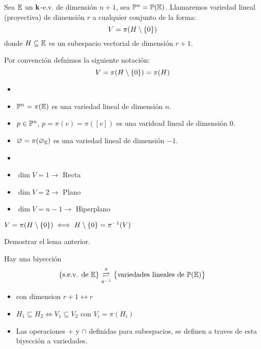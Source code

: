 \begin{defi}
	Sea $\mathbb{E}$ un $\mathbf{k}$-e.v. de dimensión $n+1$, sea $\mathbb{P}^n = \mathbb{P}(\mathbb{E})$.
	Llamaremos variedad lineal (proyectiva) de dimensión $r$ a cualquier conjunto 
	de la forma:
	\[V = \pi(H \setminus \left\{0\right\})\]
	donde $H \subseteq \mathbb{E}$ es un subespacio vectorial de dimensión $r+1$.
	
	Por convención defnimos la siguiente notación:
	\[V = \pi(H \setminus \left\{0\right\}) = \pi(H)\]         
\end{defi}    
\begin{example}
	\begin{itemize}
		\item []
		\item $\mathbb{P}^n = \pi(\mathbb{E})$ es una variedad lineal de dimensión $n$.
		\item $p \in \mathbb{P}^n$, $p = \pi(v) = \pi([v])$ es una varidead lineal de dimensión $0$.
		\item $\varnothing = \pi({\varnothing_{\mathbb{E}}})$ es una variedad lineal de dimensión $-1$.
	\end{itemize}
\end{example}
\begin{defi}
	\begin{itemize}
		\item []
		\item $\dim V = 1 \longrightarrow$ Recta
		\item $\dim V = 2 \longrightarrow$ Plano
		\item $\dim V = n-1 \longrightarrow$ Hiperplano
	\end{itemize}
\end{defi}
\begin{lema}
	$V = \pi(H\setminus\left\{0\right\}) \iff H \setminus \left\{0\right\} = \pi^{-1}(V)$
\end{lema}
\begin{ej}
	Demostrar el lema anterior.
\end{ej}
\begin{obs}
	Hay una biyección
	\[\left\{\text{s.e.v. de } \mathbb{E}\right\}
	\mathrel{\mathop{\rightleftarrows}^{\mathrm{\pi}}_{\mathrm{\pi^{-1}}}}
	\left\{\text{variedades lineales de } \mathbb{P}(\mathbb{E})\right\}\]
	\begin{itemize}
		\item con dimension $r+1 \leftrightarrow r$
		\item $H_1 \subseteq H_2 \iff V_1 \subseteq V_2$ con $V_i=\pi(H_i)$
		\item Las operaciones $+$ y $\cap$ definidas para subespacios, se definen
		a traves de esta biyección a variedades.
	\end{itemize}
\end{obs}

